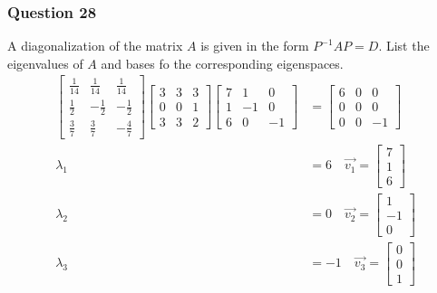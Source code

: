 \documentclass{math}
\begin{document}
\subsubsection*{Question 28}
A diagonalization of the matrix \( A \) is given in the form \( P^{-1}AP = D \).
List the eigenvalues of \( A \) and bases fo the corresponding eigenspaces.
\begin{align*}
  \begin{bmatrix}
    \frac{1}{14} & \frac{1}{14} & \frac{1}{14} \\
    \frac{1}{2} & -\frac{1}{2} & -\frac{1}{2} \\
    \frac{3}{7} & \frac{3}{7} & -\frac{4}{7}
  \end{bmatrix}\begin{bmatrix}
    3 & 3 & 3 \\
    0 & 0 & 1 \\
    3 & 3 & 2
  \end{bmatrix}\begin{bmatrix}
    7 & 1 & 0 \\
    1 & -1 & 0 \\
    6 & 0 & -1
  \end{bmatrix} &= \begin{bmatrix}
    6 & 0 & 0 \\
    0 & 0 & 0 \\
    0 & 0 & -1
  \end{bmatrix} \\
  \lambda_1 &= 6 \quad \vec{v_1} = \begin{bmatrix}7 \\ 1 \\ 6\end{bmatrix} \\
  \lambda_2 &= 0 \quad \vec{v_2} = \begin{bmatrix}1 \\ -1 \\ 0\end{bmatrix} \\
  \lambda_3 &= -1 \quad \vec{v_3} = \begin{bmatrix}0 \\ 0 \\ 1\end{bmatrix}
\end{align*}
\end{document}
